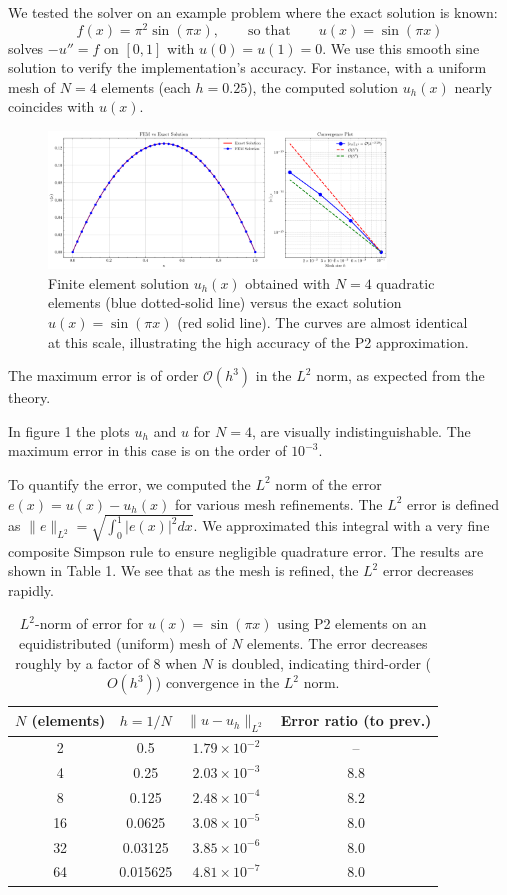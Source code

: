 \documentclass[a4paper,10pt]{article}
\begin{document}
We tested the solver on an example problem where the exact solution is known:
$$ f(x) = \pi^2 \sin(\pi x), \qquad \text{so that}\qquad u(x) = \sin(\pi x) $$
solves $-u''=f$ on $[0,1]$ with $u(0)=u(1)=0$. 
We use this smooth sine solution to verify the implementation's accuracy. 
For instance, with a uniform mesh of $N=4$ elements (each $h=0.25$), the computed solution $u_h(x)$ nearly coincides with $u(x)$. 
\begin{figure}[H]
	\centering
	\includegraphics[width=0.8\textwidth]{figures/fem_solution_20_1.png}
	\caption{Finite element solution $u_h(x)$ obtained with $N=4$ quadratic elements (blue dotted-solid line) versus the exact solution $u(x)=\sin(\pi x)$ (red solid line). 
	The curves are almost identical at this scale, illustrating the high accuracy of the P2 approximation.}
\end{figure}
The maximum error is of order \(\mathcal{O}(h^3)\) in the \(L^2\) norm, as expected from the theory.

In figure 1 the plots $u_h$ and $u$ for $N=4$, are visually indistinguishable. 
The maximum error in this case is on the order of $10^{-3}$.

To quantify the error, we computed the $L^2$ norm of the error $e(x)=u(x)-u_h(x)$ for various mesh refinements. The $L^2$ error is defined as $\|e\|_{L^2} = \sqrt{\int_0^1 |e(x)|^2 dx}$. We approximated this integral with a very fine composite Simpson rule to ensure negligible quadrature error. The results are shown in Table 1. We see that as the mesh is refined, the $L^2$ error decreases rapidly.

\begin{table}[h]
\centering
\begin{tabular}{|c|c|c|c|}
\hline
$N$ (elements) & $h=1/N$ & $\|u - u_h\|_{L^2}$ & Error ratio (to prev.) \\
\hline
2 & 0.5 & $1.79\times 10^{-2}$ & -- \\
4 & 0.25 & $2.03\times 10^{-3}$ & 8.8 \\
8 & 0.125 & $2.48\times 10^{-4}$ & 8.2 \\
16 & 0.0625 & $3.08\times 10^{-5}$ & 8.0 \\
32 & 0.03125 & $3.85\times 10^{-6}$ & 8.0 \\
64 & 0.015625 & $4.81\times 10^{-7}$ & 8.0 \\
\hline
\end{tabular}
\caption{$L^2$-norm of error for $u(x)=\sin(\pi x)$ using P2 elements on an equidistributed (uniform) mesh of $N$ elements. The error decreases roughly by a factor of 8 when $N$ is doubled, indicating third-order ($O(h^3)$) convergence in the $L^2$ norm.}
\label{tab:convergence}
\end{table}
\end{document}
